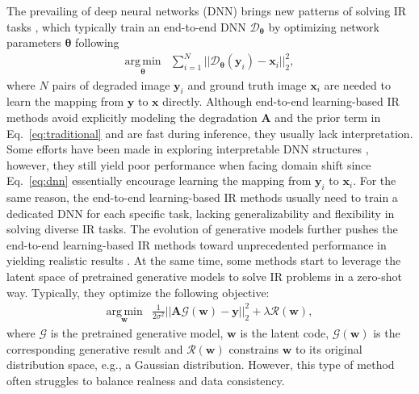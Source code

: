 \documentclass{article} \usepackage{iclr2023_conference,times}
\begin{document}
The prevailing of deep neural networks (DNN) brings new patterns of solving IR tasks \citep{srcnn}, which typically train an end-to-end DNN $\mathcal{D}_{\mathbf{\boldsymbol{\theta}}}$ by optimizing network parameters $\boldsymbol{\theta}$ following 
\begin{equation}
\begin{aligned}
    \underset{\boldsymbol{\theta}}{\operatorname{arg\, min}}
    &\sum_{i=1}^{N}||\mathcal{D}_{\boldsymbol{\theta}}(\mathbf{y}_{i})-\mathbf{x}_{i}||_{2}^{2},
    \label{eq:dnn}
\end{aligned}
\end{equation}
where $N$ pairs of degraded image $\mathbf{y}_{i}$ and ground truth image $\mathbf{x}_{i}$ are needed to learn the mapping from $\mathbf{y}$ to $\mathbf{x}$ directly. Although end-to-end learning-based IR methods avoid explicitly modeling the degradation $\mathbf{A}$ and the prior term in Eq.~\ref{eq:traditional} and are fast during inference, they usually lack interpretation. Some efforts have been made in exploring interpretable DNN structures \citep{zhang2018ista,zhang2020dunsr}, however, they still yield poor performance when facing domain shift since Eq.~\ref{eq:dnn} essentially encourage learning the mapping from $\mathbf{y}_{i}$ to $\mathbf{x}_{i}$. For the same reason, the end-to-end learning-based IR methods usually need to train a dedicated DNN for each specific task, lacking generalizability and flexibility in solving diverse IR tasks. The evolution of generative models \citep{gan, kingma2014auto,vqvae,stylegan,stylegan2,stylegan3} further pushes the end-to-end learning-based IR methods toward unprecedented performance in yielding realistic results \citep{gpen,gfpgan,glean,panini}. At the same time, some methods \citep{menon2020pulse,pan2021exploiting} start to leverage the latent space of pretrained generative models to solve IR problems in a zero-shot way. Typically, they optimize the following objective: 
\begin{equation}
\begin{aligned}
    \underset{\mathbf{w}}{\operatorname{arg\, min}}
    &\frac{1}{2\sigma^{2}}||\mathbf{A}\mathcal{G}(\mathbf{w})-\mathbf{y}||_{2}^{2}+\lambda \mathcal{R}(\mathbf{w}),
    \label{eq:pulse}
\end{aligned}
\end{equation}
where $\mathcal{G}$ is the pretrained generative model, $\mathbf{w}$ is the latent code, $\mathcal{G}(\mathbf{w})$ is the corresponding generative result and $\mathcal{R}(\mathbf{w})$ constrains $\mathbf{w}$ to its original distribution space, e.g., a Gaussian distribution. However, this type of method often struggles to balance realness and data consistency.
\end{document}
